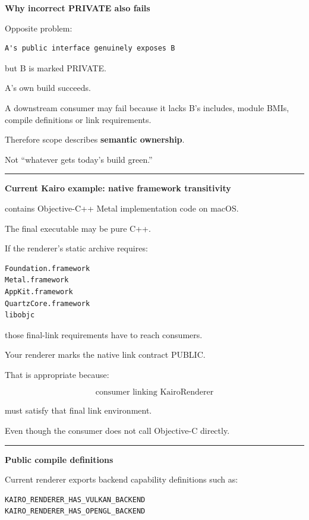 \textbf{Why incorrect PRIVATE also fails}

Opposite problem:

\begin{verbatim}
A's public interface genuinely exposes B
\end{verbatim}

but B is marked PRIVATE.

A's own build succeeds.

A downstream consumer may fail because it lacks B's includes, module BMIs, compile definitions or link requirements.

Therefore scope describes \textbf{semantic ownership}.

Not ``whatever gets today's build green.''

\begin{center}\rule{0.5\linewidth}{0.5pt}\end{center}

\textbf{Current Kairo example: native framework transitivity}

 contains Objective-C++ Metal implementation code on macOS.

The final executable may be pure C++.

If the renderer's static archive requires:

\begin{verbatim}
Foundation.framework
Metal.framework
AppKit.framework
QuartzCore.framework
libobjc
\end{verbatim}

those final-link requirements have to reach consumers.

Your renderer marks the native link contract PUBLIC.

That is appropriate because:

\[
\text{consumer linking KairoRenderer}
\]

must satisfy that final link environment.

Even though the consumer does not call Objective-C directly.

\begin{center}\rule{0.5\linewidth}{0.5pt}\end{center}

\textbf{Public compile definitions}

Current renderer exports backend capability definitions such as:

\begin{verbatim}
KAIRO_RENDERER_HAS_VULKAN_BACKEND
KAIRO_RENDERER_HAS_OPENGL_BACKEND
\end{verbatim}

